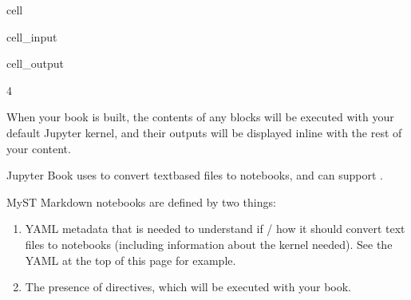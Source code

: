 \documentclass[letterpaper,10pt,english]{jupyterBook}
\begin{document}
\begin{sphinxuseclass}{cell}\begin{sphinxVerbatimInput}

\begin{sphinxuseclass}{cell_input}
\begin{sphinxVerbatim}[commandchars=\\\{\}]
  
\end{sphinxVerbatim}

\end{sphinxuseclass}\end{sphinxVerbatimInput}
\begin{sphinxVerbatimOutput}

\begin{sphinxuseclass}{cell_output}
\begin{sphinxVerbatim}[commandchars=\\\{\}]
4
\end{sphinxVerbatim}

\end{sphinxuseclass}\end{sphinxVerbatimOutput}

\end{sphinxuseclass}
\sphinxAtStartPar
When your book is built, the contents of any  blocks will be
executed with your default Jupyter kernel, and their outputs will be displayed
in\sphinxhyphen{}line with the rest of your content.


\nopagebreak


\sphinxAtStartPar
Jupyter Book uses  to convert text\sphinxhyphen{}based files to notebooks, and can support .



\begin{DUlineblock}{0em}
\item[] 
\end{DUlineblock}

\sphinxAtStartPar
MyST Markdown notebooks are defined by two things:
\begin{enumerate}
%
\item {} 
\sphinxAtStartPar
YAML metadata that is needed to understand if / how it should convert text files to notebooks (including information about the kernel needed).
See the YAML at the top of this page for example.

\item {} 
\sphinxAtStartPar
The presence of  directives, which will be executed with your book.

\end{enumerate}
\end{document}
